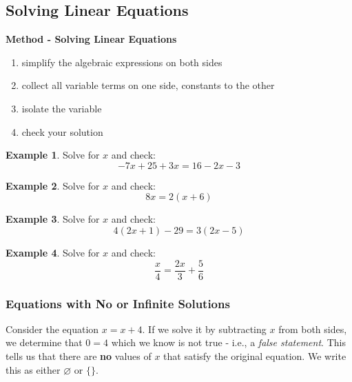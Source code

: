 \documentclass[addpoints,12pt]{exam}
\theoremstyle{definition}
\theoremstyle{break}
\theoremstyle{break}
\newtheorem{example}{Example}[subsection]
\begin{document}
\setcounter{section}{2}
\setcounter{subsection}{2}

\subsection{Solving Linear Equations}

\vspace{.25in}

\begin{mdframed}
\textbf{Method - Solving Linear Equations}
\begin{enumerate}
\item simplify the algebraic expressions on both sides
\item collect all variable terms on one side, constants to the other
\item isolate the variable
\item check your solution
\end{enumerate}
\end{mdframed}

\vspace{.15in}

\begin{example}
Solve for $x$ and check: \[-7x + 25 + 3x = 16 - 2x - 3\]
\vspace{2in}
\end{example}

\begin{example}
Solve for $x$ and check: \[8x = 2(x+6)\]
\end{example}

\newpage

\begin{example}
Solve for $x$ and check: \[4(2x + 1) - 29 = 3(2x - 5)\]
\vspace{2.5in}
\end{example}

\begin{example}
Solve for $x$ and check: \[\dfrac{x}{4} = \dfrac{2x}{3} + \dfrac{5}{6}\]
\end{example}

\newpage

\subsubsection*{Equations with No or Infinite Solutions}
\noindent Consider the equation $x = x + 4$. If we solve it by subtracting $x$ from both sides, we determine that $0 = 4$ which we know is not true - i.e., a \emph{false statement}. This tells us that there are \textbf{no} values of $x$ that satisfy the original equation. We write this as either $\varnothing$ or $\{\}$.
\end{document}
